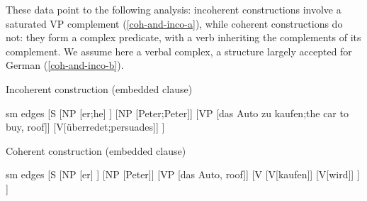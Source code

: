\documentclass[output=paper]{langsci/langscibook}
\begin{document}
\begin{exe}
	\ex  \label{scrambling}
	
	\begin{xlist}
		
		 \label{scrambling-a}
		
		  \label{scrambling-b}
		
		 \label{scrambling-c}
		
		 \label{scrambling-d}
	\end{xlist}
	
\end{exe}

	
	These data point to the following analysis: incoherent constructions involve a saturated VP complement (\ref{coh-and-inco-a}), while coherent constructions do not: they form a complex predicate, with a verb inheriting the complements of its complement. We assume here a verbal complex, a structure largely accepted for German (\ref{coh-and-inco-b}).
	
	
	\begin{exe}
		\ex  \label{coh-and-inco}
		
		\begin{xlist} 
			
			\ex  \label{coh-and-inco-a}
			Incoherent construction (embedded clause)
			
			\begin{forest}
                          sm edges
				[S
				[NP [er;he] ] 
				[NP [Peter;Peter]]
				[VP [das Auto zu kaufen;the car to buy, roof]]
				[V[\"uberredet;persuades]]
				]
			\end{forest}
			
			\ex  \label{coh-and-inco-b}
			Coherent construction (embedded clause)
			
			\begin{forest}
                          sm edges
				[S
				[NP [er] ] 
				[NP [Peter]]
				[VP [das Auto, roof]]
				[V
				[V[kaufen]]
				[V[wird]]
				]
				]
			\end{forest}
			
		\end{xlist}
		
	\end{exe}
	
\end{document}
